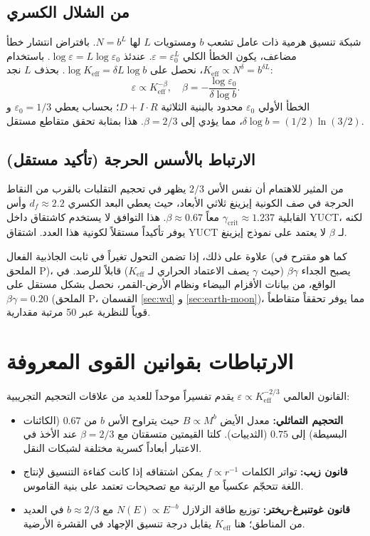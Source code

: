 \documentclass[11pt,a4paper]{article}
\newcommand{\ar}[1]{\foreignlanguage{arabic}{#1}}
\newcommand{\Keff}{K_{\mathrm{eff}}}
\newcommand{\eps}{\varepsilon}
\begin{document}
	\subsection*{\ar{من الشلال الكسري}}
	\ar{شبكة تنسيق هرمية ذات عامل تشعب \(b\) ومستويات \(L\) لها \(N = b^L\). بافتراض انتشار خطأ مضاعف، يكون الخطأ الكلي \(\eps = \eps_0^{L}\). عندئذ \(\log \eps = L \log \eps_0\). باستخدام \(\Keff \propto N^{\delta} = b^{\delta L}\)، نحصل على \(\log \Keff = \delta L \log b\). بحذف \(L\) نجد:}
	\[
	\eps \propto \Keff^{-\beta}, \quad \beta = -\frac{\log \eps_0}{\delta \log b}.
	\]
	\ar{الخطأ الأولي \(\eps_0\) محدود بالبنية الثلاثية \(D+I\!\cdot\!R\)؛ بحساب يعطي \(\eps_0 = 1/3\) و \(\delta \log b = (1/2)\ln(3/2)\)، مما يؤدي إلى \(\beta = 2/3\). هذا بمثابة تحقق متقاطع مستقل.}
	
	\subsection*{\ar{الارتباط بالأسس الحرجة (تأكيد مستقل)}}
	\ar{من المثير للاهتمام أن نفس الأس \(2/3\) يظهر في تحجيم التقلبات بالقرب من النقاط الحرجة في صف الكونية إيزينغ ثلاثي الأبعاد، حيث يعطي البعد الكسري \(d_f \approx 2.2\) وأس القابلية \(\gamma_{\mathrm{crit}} \approx 1.237\) معاً \(\beta \approx 0.67\). هذا التوافق لا يستخدم كاشتقاق داخل YUCT، لكنه يوفر تأكيداً مستقلاً لكونية هذا العدد. اشتقاق YUCT لـ \(\beta\) لا يعتمد على نموذج إيزينغ.}
	
	\ar{علاوة على ذلك، إذا تضمن التحول تغيراً في ثابت الجاذبية الفعال (كما هو مقترح في الملحق P)، يصبح الجداء \(\beta\gamma\) (حيث \(\gamma\) يصف الاعتماد الحراري لـ \(K_{\mathrm{eff}}\)) قابلاً للرصد. في الواقع، من بيانات الأقزام البيضاء ونظام الأرض-القمر، نحصل بشكل مستقل على \(\beta\gamma = 0.20\) (الملحق P، القسمان \ref{sec:wd} و \ref{sec:earth-moon})، مما يوفر تحققاً متقاطعاً قوياً للنظرية عبر 50 مرتبة مقدارية.}
	
	\section{\ar{الارتباطات بقوانين القوى المعروفة}}
	\label{sec:connections}
	
	\ar{القانون العالمي \(\eps \propto \Keff^{-2/3}\) يقدم تفسيراً موحداً للعديد من علاقات التحجيم التجريبية:}
	
	\begin{itemize}
		\item \textbf{\ar{التحجيم التماثلي:}} \ar{معدل الأيض \(B \propto M^{b}\) حيث يتراوح الأس \(b\) من \(0.67\) (الكائنات البسيطة) إلى \(0.75\) (الثدييات). كلتا القيمتين متسقتان مع \(\beta = 2/3\) عند الأخذ في الاعتبار أبعاداً كسرية مختلفة لشبكات النقل.}
		\item \textbf{\ar{قانون زيب:}} \ar{تواتر الكلمات \(f \propto r^{-1}\) يمكن اشتقاقه إذا كانت كفاءة التنسيق لإنتاج اللغة تتحجّم عكسياً مع الرتبة مع تصحيحات تعتمد على بنية القاموس.}
		\item \textbf{\ar{قانون غوتنبرغ-ريختر:}} \ar{توزيع طاقة الزلازل \(N(E) \propto E^{-b}\) مع \(b \approx 2/3\) في العديد من المناطق؛ هنا \(\Keff\) يقابل درجة تنسيق الإجهاد في القشرة الأرضية.}
	\end{itemize}
	
\end{document}
